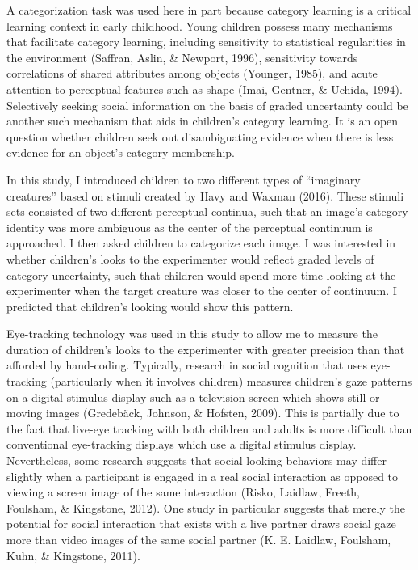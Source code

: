 \documentclass[floatsintext,man]{apa6}
\theoremstyle{definition}
\theoremstyle{definition}
\theoremstyle{definition}
\theoremstyle{remark}
\begin{document}
A categorization task was used here in part because category learning is
a critical learning context in early childhood. Young children possess
many mechanisms that facilitate category learning, including sensitivity
to statistical regularities in the environment (Saffran, Aslin, \&
Newport, 1996), sensitivity towards correlations of shared attributes
among objects (Younger, 1985), and acute attention to perceptual
features such as shape (Imai, Gentner, \& Uchida, 1994). Selectively
seeking social information on the basis of graded uncertainty could be
another such mechanism that aids in children's category learning. It is
an open question whether children seek out disambiguating evidence when
there is less evidence for an object's category membership.

In this study, I introduced children to two different types of
\enquote{imaginary creatures} based on stimuli created by Havy and
Waxman (2016). These stimuli sets consisted of two different perceptual
continua, such that an image's category identity was more ambiguous as
the center of the perceptual continuum is approached. I then asked
children to categorize each image. I was interested in whether
children's looks to the experimenter would reflect graded levels of
category uncertainty, such that children would spend more time looking
at the experimenter when the target creature was closer to the center of
continuum. I predicted that children's looking would show this pattern.

Eye-tracking technology was used in this study to allow me to measure
the duration of children's looks to the experimenter with greater
precision than that afforded by hand-coding. Typically, research in
social cognition that uses eye-tracking (particularly when it involves
children) measures children's gaze patterns on a digital stimulus
display such as a television screen which shows still or moving images
(Gredebäck, Johnson, \& Hofsten, 2009). This is partially due to the
fact that live-eye tracking with both children and adults is more
difficult than conventional eye-tracking displays which use a digital
stimulus display. Nevertheless, some research suggests that social
looking behaviors may differ slightly when a participant is engaged in a
real social interaction as opposed to viewing a screen image of the same
interaction (Risko, Laidlaw, Freeth, Foulsham, \& Kingstone, 2012). One
study in particular suggests that merely the potential for social
interaction that exists with a live partner draws social gaze more than
video images of the same social partner (K. E. Laidlaw, Foulsham, Kuhn,
\& Kingstone, 2011).
\end{document}
